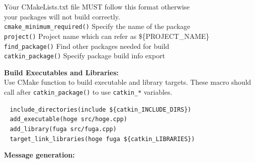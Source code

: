 \documentclass[10pt,landscape]{article}
\begin{document}
\begin{multicols}{3}
\begin{tabbing}
Y\=our CMakeLists.tx\=t file MUST follow this format otherwise\\ your
packages will not build correctly.\\
\> \texttt{cmake\_minimum\_required()} Specify the name of the package\\
\> \texttt{project()} Project name which can refer as \$\{PROJECT\_NAME\}\\
\> \texttt{find\_package()} \> Find other packages needed for build\\
\> \texttt{catkin\_package()} \> Specify package build info export\\
\end{tabbing}
\vspace{-3.5mm}
\vspace{-2mm}
{\bf Build Executables and Libraries:}\\
Use CMake function to build executable and library targets. These
macro should call after \texttt{catkin\_package()} to use
\texttt{catkin\_*} variables.
\vspace{-3.5mm}
\begin{tabbing}
~ \texttt{include\_directories(include \$\{catkin\_INCLUDE\_DIRS\})}\\
~ \texttt{add\_executable(hoge src/hoge.cpp)}\\
~ \texttt{add\_library(fuga src/fuga.cpp)}\\
~ \texttt{target\_link\_libraries(hoge fuga \$\{catkin\_LIBRARIES\})}\\
\end{tabbing}
\vspace{-3.5mm}
\vspace{-2mm}
{\bf Message generation:}\\

\end{multicols}
\end{document}
